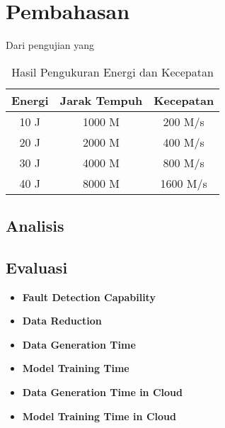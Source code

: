 \section{Pembahasan}
\label{sec:pembahasan}

Dari pengujian yang \lipsum[1]

\begin{longtable}{|c|c|c|}
  \caption{Hasil Pengukuran Energi dan Kecepatan}
  \label{tb:EnergiKecepatan}                                   \\
  \hline
  \rowcolor[HTML]{C0C0C0}
  \textbf{Energi} & \textbf{Jarak Tempuh} & \textbf{Kecepatan} \\
  \hline
  10 J            & 1000 M                & 200 M/s            \\
  20 J            & 2000 M                & 400 M/s            \\
  30 J            & 4000 M                & 800 M/s            \\
  40 J            & 8000 M                & 1600 M/s           \\
  \hline
\end{longtable}

\lipsum[2]

\subsection{Analisis}
\label{subsec:analisis}

\lipsum[3]

\subsection{Evaluasi}
\label{subsec:evaluasi}

\lipsum[4]

\begin{itemize}
  \item \textbf{Fault Detection Capability} \\
        \lipsum[5]
  \item \textbf{Data Reduction} \\
        \lipsum[6]
  \item \textbf{Data Generation Time} \\
        \lipsum[7]
  \item \textbf{Model Training Time} \\
        \lipsum[8]
  \item \textbf{Data Generation Time in Cloud} \\
        \lipsum[9]
  \item \textbf{Model Training Time in Cloud} \\
        \lipsum[10]
\end{itemize}
